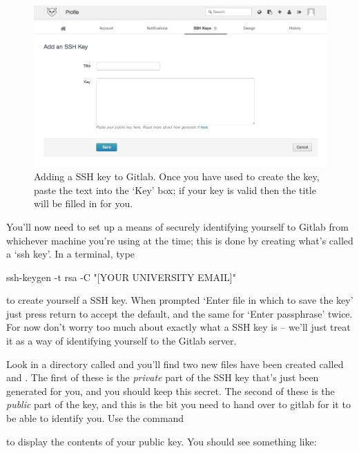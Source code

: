 \begin{figure}
\centerline{\includegraphics[width=13cm]{images/gitlab-ssh}}
\caption{Adding a SSH key to Gitlab. Once you have used  to create the key, paste the text into the `Key' box; if your key is valid then the title will be filled in for you.}\label{figure:gitlab-ssh}
\end{figure}


You'll now need to set up a means of securely identifying yourself to Gitlab from whichever machine you're using at the time; this is done by creating what's called a `ssh key'. In a terminal, type

\begin{ttoutenv}
ssh-keygen -t rsa -C "[YOUR UNIVERSITY EMAIL]"
\end{ttoutenv}

to create yourself a SSH key. When prompted `Enter file in which to save the key' just press return to accept the default, and the same for `Enter passphrase' twice.  For now don't worry too much about exactly what a SSH key is -- we'll just treat it as a way of identifying yourself to the Gitlab server. 

Look in a directory called  and you'll find two new files have been created called  and . The first of these is the \textit{private} part of the SSH key that's just been generated for you, and you should keep this secret. The second of these is the \textit{public} part of the key, and this is the bit you need to hand over to gitlab for it to be able to identify you. Use the command

to display the contents of your public key. You should see something like:


